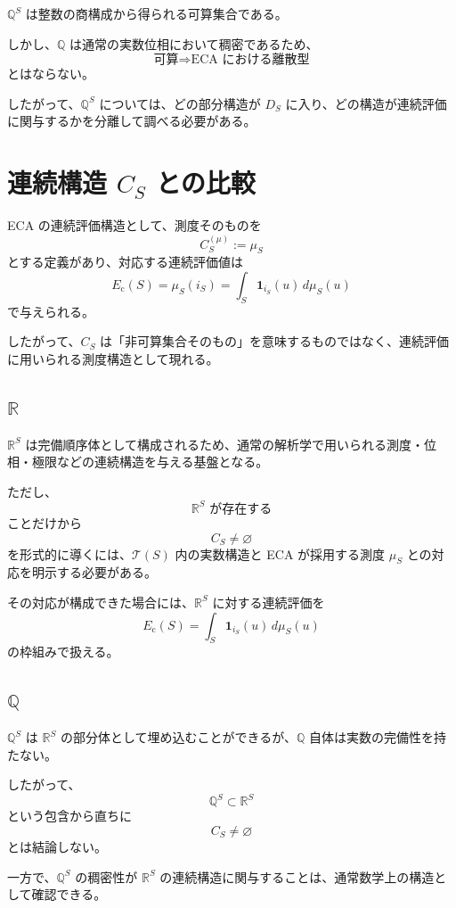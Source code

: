 \documentclass[a4paper,11pt]{article}
\newcommand{\Q}{\mathbb{Q}}
\newcommand{\R}{\mathbb{R}}
\begin{document}
$\Q^S$ は整数の商構成から得られる可算集合である。

しかし、$\Q$ は通常の実数位相において稠密であるため、
\[
\text{可算}\Rightarrow\text{ECA における離散型}
\]
とはならない。

したがって、$\Q^S$ については、どの部分構造が $D_S$ に入り、どの構造が連続評価に関与するかを分離して調べる必要がある。

\section{連続構造 $C_S$ との比較}

ECA の連続評価構造として、測度そのものを
\[
C_S^{(\mu)}:=\mu_S
\]
とする定義があり、対応する連続評価値は
\[
E_{\mathrm{c}}(S)
=
\mu_S(i_S)
=
\int_S\mathbf 1_{i_S}(u)\,d\mu_S(u)
\]
で与えられる。

したがって、$C_S$ は「非可算集合そのもの」を意味するものではなく、連続評価に用いられる測度構造として現れる。

\subsection{$\R$}

$\R^S$ は完備順序体として構成されるため、通常の解析学で用いられる測度・位相・極限などの連続構造を与える基盤となる。

ただし、
\[
\R^S\text{ が存在する}
\]
ことだけから
\[
C_S\neq\varnothing
\]
を形式的に導くには、$\mathcal{T}(S)$ 内の実数構造と ECA が採用する測度 $\mu_S$ との対応を明示する必要がある。

その対応が構成できた場合には、$\R^S$ に対する連続評価を
\[
E_{\mathrm{c}}(S)
=
\int_S\mathbf 1_{i_S}(u)\,d\mu_S(u)
\]
の枠組みで扱える。

\subsection{$\Q$}

$\Q^S$ は $\R^S$ の部分体として埋め込むことができるが、$\Q$ 自体は実数の完備性を持たない。

したがって、
\[
\Q^S\subset\R^S
\]
という包含から直ちに
\[
C_S\neq\varnothing
\]
とは結論しない。

一方で、$\Q^S$ の稠密性が $\R^S$ の連続構造に関与することは、通常数学上の構造として確認できる。

\end{document}
